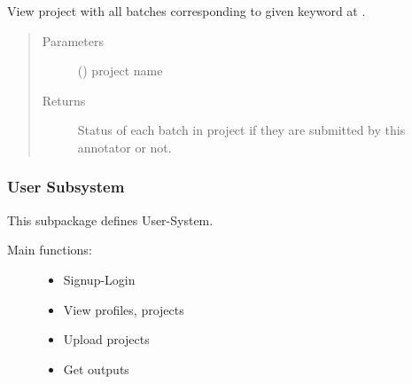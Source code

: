 \documentclass[a4paper,12pt,english]{sphinxmanual}
\begin{document}
\begin{fulllineitems}
\label{\detokenize{project_rst/annotator_rst/routes:project.annotator.views.project}}
View project with all batches corresponding to given keyword at .
\begin{quote}\begin{description}
\item[{Parameters}] \leavevmode
{} () \textendash{} project name

\item[{Returns}] \leavevmode
Status of each batch in project if they are submitted by this annotator or not.

\end{description}\end{quote}

\end{fulllineitems}



\subsubsection{User Subsystem}
\label{\detokenize{project_rst/user_rst/user:module-project.user.__init__}}\label{\detokenize{project_rst/user_rst/user:user-subsystem}}\label{\detokenize{project_rst/user_rst/user::doc}}
 

This subpackage defines User-System.
\begin{description}
\item[{Main functions:}] \leavevmode\begin{itemize}
\item {} 
Signup-Login

\item {} 
View profiles, projects

\item {} 
Upload projects

\item {} 
Get outputs

\end{itemize}

\end{description}
\end{document}
